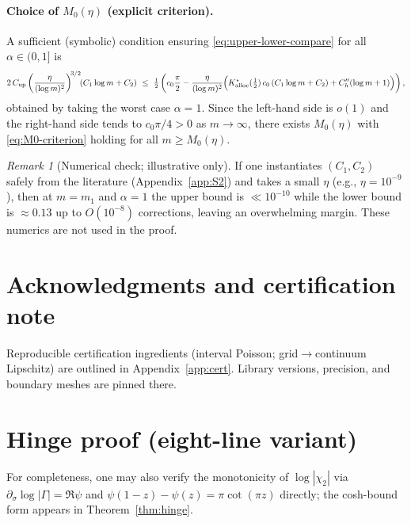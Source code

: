 \documentclass[11pt]{article}
\numberwithin{equation}{section}
\theoremstyle{remark}
\newtheorem{remark}[theorem]{Remark}
\begin{document}
\paragraph{Choice of $M_0(\eta)$ (explicit criterion).}
A sufficient (symbolic) condition ensuring \eqref{eq:upper-lower-compare} for all $\alpha\in(0,1]$ is
\begin{equation}\label{eq:M0-criterion}
2\,C_{\mathrm{up}}\left(\frac{\eta}{(\log m)^2}\right)^{\!3/2}\!\!(C_1\log m+C_2)\ \le\ \tfrac12\left(c_0\frac{\pi}{2}-\frac{\eta}{(\log m)^2}\Big(K_{\rm alloc}^{\star}(\tfrac12)\,c_0\,(C_1\log m+C_2)+C_h''(\log m+1)\Big)\right),
\end{equation}
obtained by taking the worst case $\alpha=1$. Since the left-hand side is $o(1)$ and the right-hand side tends to $c_0\pi/4>0$ as $m\to\infty$, there exists $M_0(\eta)$ with \eqref{eq:M0-criterion} holding for all $m\ge M_0(\eta)$.

\begin{remark}[Numerical check; illustrative only]
If one instantiates $(C_1,C_2)$ safely from the literature (Appendix~\ref{app:S2}) and takes a small $\eta$ (e.g., $\eta=10^{-9}$), then at $m=m_1$ and $\alpha=1$ the upper bound is $\ll 10^{-10}$ while the lower bound is $\approx 0.13$ up to $O(10^{-8})$ corrections, leaving an overwhelming margin. These numerics are not used in the proof.
\end{remark}

\section*{Acknowledgments and certification note}
Reproducible certification ingredients (interval Poisson; grid$\to$continuum Lipschitz) are outlined in Appendix~\ref{app:cert}. %
Library versions, precision, and boundary meshes are pinned there.


\appendix

\section{Hinge proof (eight-line variant)}
For completeness, one may also verify the monotonicity of $\log|\chi_2|$ via $\partial_\sigma\log|\Gamma|=\Re\psi$ and $\psi(1-z)-\psi(z)=\pi\cot(\pi z)$ directly; the cosh-bound form appears in Theorem~\ref{thm:hinge}.
\end{document}
